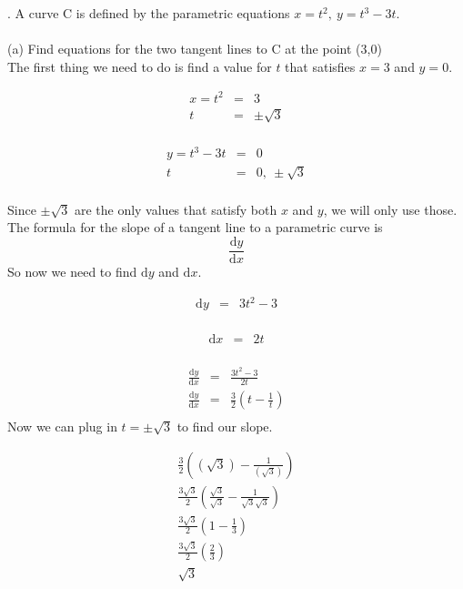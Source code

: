 \documentclass[11pt]{exam}
\begin{document}
. A curve C is defined by the parametric equations $x=t^2,\ y=t^3-3t$. \\
\\
\indent (a) Find equations for the two tangent lines to C at the point (3,0)
\\
The first thing we need to do is find a value for $t$ that satisfies $x=3$ and $y=0$.\\
\noindent
\begin{minipage}{.5\linewidth}
	\begin{eqnarray*}
		x = t^2 &=& 3\\
		t &=& \pm \sqrt{3}\\
	\end{eqnarray*}
\end{minipage}
\begin{minipage}{.5\linewidth}
	\begin{eqnarray*}
  		y = t^3-3t &=& 0\\
  		t &=& 0,\ \pm \sqrt{3}\\  		
	\end{eqnarray*}
\end{minipage}
Since $\pm \sqrt{3}$ are the only values that satisfy both $x$ and $y$, we will only use those.\\
The formula for the slope of a tangent line to a parametric curve is
$$\frac{\mathrm{d}y}{\mathrm{d}x}$$
So now we need to find $\mathrm{d}y$ and $\mathrm{d}x$.\\
\noindent
\begin{minipage}{.5\linewidth}
	\begin{eqnarray*}
		\mathrm{d}y &=& 3t^2 - 3\\
	\end{eqnarray*}
\end{minipage}
\begin{minipage}{.5\linewidth}
	\begin{eqnarray*}
  		\mathrm{d}x &=& 2t\\ 		
	\end{eqnarray*}
\end{minipage}
\begin{eqnarray*}
	\frac{\mathrm{d}y}{\mathrm{d}x} &=& \frac{3t^2 - 3}{2t}\\
	\frac{\mathrm{d}y}{\mathrm{d}x} &=& \frac{3}{2}\left(t-\frac{1}{t}\right)\\
\end{eqnarray*}
Now we can plug in $t = \pm \sqrt{3}$ to find our slope.\\
\noindent
\begin{minipage}{.5\linewidth}
	\begin{eqnarray*}
		\frac{3}{2}\left(( \sqrt{3} )-\frac{1}{( \sqrt{3} )}\right) \\
		\frac{3 \sqrt{3} }{2}\left( \frac{\sqrt{3} }{ \sqrt{3} } -\frac{1}{ \sqrt{3} \sqrt{3} }\right) \\
		\frac{3 \sqrt{3} }{2}\left( 1 -\frac{1}{ 3 }\right) \\
		\frac{3 \sqrt{3} }{2}\left( \frac{2}{ 3 }\right) \\
		\sqrt{3}\\
	\end{eqnarray*}
\end{minipage}
\end{document}
